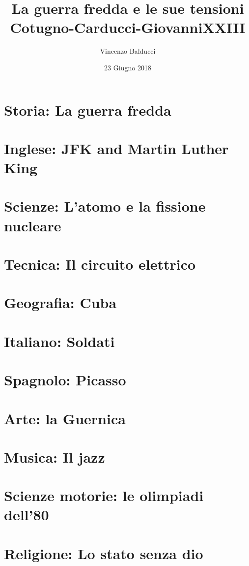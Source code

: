 \documentclass[12pt,twoside]{report}
\title{
  {La guerra fredda e le sue tensioni}\\
  {\large Cotugno-Carducci-GiovanniXXIII}
}
\author{Vincenzo Balducci}
\date{23 Giugno 2018}
\begin{document}
\maketitle

\tableofcontents

\chapter{Storia: La guerra fredda}


\chapter{Inglese: JFK and Martin Luther King}


\chapter{Scienze: L'atomo e la fissione nucleare}


\chapter{Tecnica: Il circuito elettrico}


\chapter{Geografia: Cuba}


\chapter{Italiano: Soldati}



\chapter{Spagnolo: Picasso}


\chapter{Arte: la Guernica}


\chapter{Musica: Il jazz}


\chapter{Scienze motorie: le olimpiadi dell'80}


\chapter{Religione: Lo stato senza dio}

\end{document}
